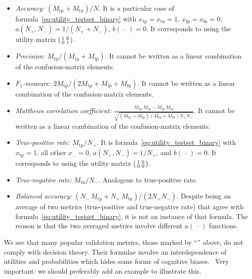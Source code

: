 \documentclass[\ifafour a4paper,12pt,\else a5paper,10pt,\fi%
onecolumn,oneside,article,%
british%
]{memoir}
\theoremstyle{remark}
\theoremstyle{innote}
\newcommand*{\dotv}{\mathord{\,\cdot\,}}%
\renewcommand*{\|}[1][]{\nonscript\:#1\vert\nonscript\:\mathopen{}}
\newcommand*{\wrench}{{\fontencoding{U}\fontfamily{fontawesomethree}\selectfont\symbol{114}}}
\newcommand{\mynotew}[1]{{\footnotesize\color{notecolour}\wrench\ #1}}
\newcommand*{\Po}{\mathord{+}}
\newcommand*{\Ne}{\mathord{-}}
\newcommand*{\tp}{\textrm{tp}}
\newcommand*{\fp}{\textrm{fp}}
\newcommand*{\fn}{\textrm{fn}}
\newcommand*{\tn}{\textrm{tn}}
\newcommand*{\itemyes}{{\fontencoding{U}\fontfamily{pzd}\selectfont\symbol{51}}}
\newcommand*{\itemno}{{\fontencoding{U}\fontfamily{pzd}\selectfont\symbol{55}}}
\begin{document}
\begin{itemize}
\item[\itemyes] \emph{Accuracy:} $(M_{\tp}+M_{\tn})/N$. It is a particular case of formula~\eqref{eq:utility_testset_binary} with $x_{\tp}=x_{\tn}=1$,\; $x_{\fp}=x_{\fn}=0$,\; $a(N_{\Po},N_{\Ne})=1/(N_{\Po}+N_{\Ne})$,\; $b(\dotv)=0$. It corresponds to using the utility matrix $\begin{psmallmatrix} 1&0\\0&1 \end{psmallmatrix}$.
  
\item[\itemno] \emph{Precision:} $M_{\tp}/(M_{\tp}+M_{\fp})$. It cannot be written as a linear combination of the confusion-matrix elements.

\item[\itemno] \emph{$F_{1}$-measure:} $2 M_{\tp}/(2M_{\tp} + M_{\fp} + M_{\fn})$. It cannot be written as a linear combination of the confusion-matrix elements.

\item[\itemno] \emph{Matthews correlation coefficient:} $\frac{M_{\tp}\, M_{\tn} - M_{\fp}\, M_{\fn}}{\sqrt{(M_{\tp}+M_{\fp})(M_{\tn}+M_{\fn})N_{\Po}N_{\Ne}}}$. It cannot be written as a linear combination of the confusion-matrix elements.

\item[\itemyes] \emph{True-positive rate:} $M_{\tp}/N_{\Po}$. It is  formula~\eqref{eq:utility_testset_binary} with $x_{\tp}=1$, all other $x_{\dotso}=0$, $a(N_{\Po},N_{\Ne})=1/N_{\Po}$, and $b(\dotv)=0$. It corresponds to using the utility matrix $\begin{psmallmatrix} 1&0\\0&0 \end{psmallmatrix}$. 

\item[\itemyes] \emph{True-negative rate:} $M_{\tn}/N_{\Ne}$. Analogous to true-positive rate.

\item[\itemno] \emph{Balanced accuracy:} $(N_{\Ne}\,M_{\tp} + N_{\Po}\, M_{\tn})/(2 N_{\Po}N_{\Ne})$. Despite being an average of two metrics (true-positive and true-negative rate) that agree with formula~\eqref{eq:utility_testset_binary}, it is not an instance of that formula. The reason is that the two averaged metrics involve different $a(\dotv)$ functions.
\end{itemize}

We see that many popular validation metrics, those marked by \enquote{\itemno} above, do not comply with decision theory. Their formulae involve an interdependence of utilities and probabilities which hides some forms of cognitive biases.
\mynotew{Very important: we should preferably add an example to illustrate this.}
\end{document}
